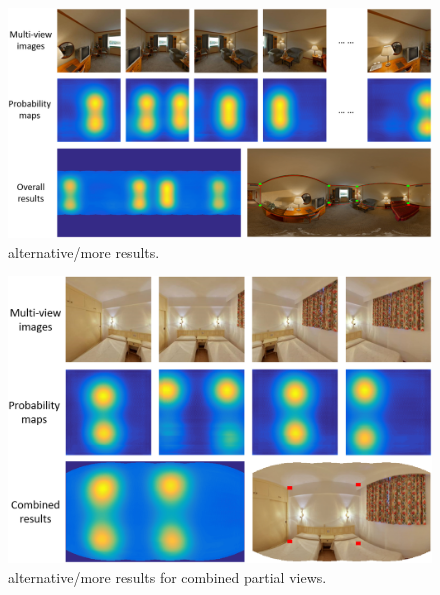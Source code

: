 \begin{figure}
	\centering
	\includegraphics[width=\linewidth]{figs/results3.png}
	\caption{alternative/more results. }
	\label{fig:results3}
\end{figure}

\begin{figure}
	\centering
	\includegraphics[width=\linewidth]{figs/partial1.png}
	\caption{alternative/more results for combined partial views. }
	\label{fig:partial1}
\end{figure}